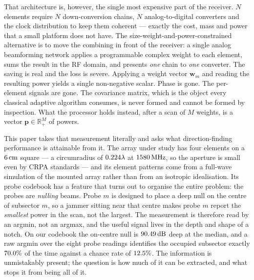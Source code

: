 \documentclass[journal]{IEEEtran}
\newcommand{\wv}{\mathbf{w}}
\newcommand{\pv}{\mathbf{p}}
\newcommand{\dB}{\,\mathrm{dB}}
\begin{document}
That architecture is, however, the single most expensive part of the receiver.
$N$ elements require $N$ down-conversion chains, $N$ analog-to-digital
converters and the clock distribution to keep them coherent --- exactly the
cost, mass and power that a small platform does not have. The
size-weight-and-power-constrained alternative is to move the combining in
front of the receiver: a single analog beamforming network applies a
programmable complex weight to each element, sums the result in the RF domain,
and presents \emph{one} chain to \emph{one} converter. The saving is real and
the loss is severe. Applying a weight vector $\wv_m$ and reading the resulting
power yields a single non-negative scalar. Phase is gone. The per-element
signals are gone. The covariance matrix, which is the object every classical
adaptive algorithm consumes, is never formed and cannot be formed by
inspection. What the processor holds instead, after a scan of $M$ weights, is a
vector $\pv \in \mathbb{R}_{+}^{M}$ of powers.

This paper takes that measurement literally and asks what direction-finding
performance is attainable from it. The array under study has four elements on
a $6\,\mathrm{cm}$ square --- a circumradius of $0.224\lambda$ at
$1580\,\mathrm{MHz}$, so the aperture is small even by CRPA standards --- and
its element patterns come from a full-wave simulation of the mounted array
rather than from an isotropic idealisation. Its probe
codebook has a feature that turns out to organise the entire problem: the
probes are \emph{nulling} beams. Probe $m$ is designed to place a deep null on
the centre of subsector $m$, so a jammer sitting near that centre makes probe
$m$ report the \emph{smallest} power in the scan, not the largest. The
measurement is therefore read by an argmin, not an argmax, and the useful
signal lives in the depth and shape of a notch. On our codebook the on-centre
null is $\nullDepthMed\dB$ deep at the median, and a raw argmin over the eight probe
readings identifies the occupied subsector exactly $70.0\%$ of the time
against a chance rate of $12.5\%$. The information is unmistakably present;
the question is how much of it can be extracted, and what stops it from being
all of it.
\end{document}
